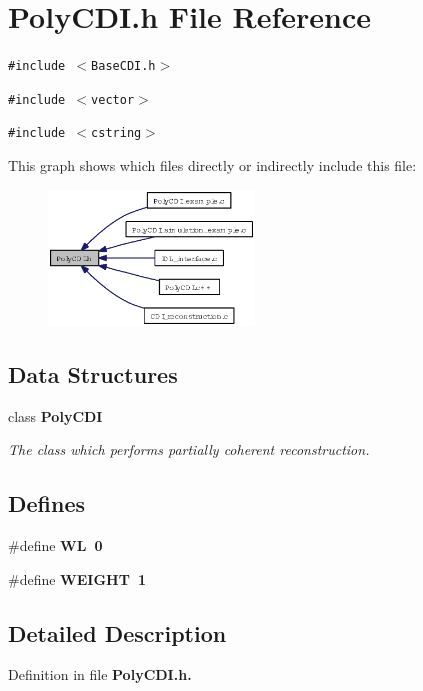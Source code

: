 \section{Poly\-CDI.h File Reference}
\label{PolyCDI_8h}
{\tt \#include $<$Base\-CDI.h$>$}\par
{\tt \#include $<$vector$>$}\par
{\tt \#include $<$cstring$>$}\par


This graph shows which files directly or indirectly include this file:\begin{figure}[H]
\begin{center}
\leavevmode
\includegraphics[width=155pt]{PolyCDI_8h__dep__incl}
\end{center}
\end{figure}
\subsection*{Data Structures}
\begin{CompactItemize}
\item 
class \bf{Poly\-CDI}
\begin{CompactList}\small\item\em The class which performs partially coherent reconstruction. \item\end{CompactList}\end{CompactItemize}
\subsection*{Defines}
\begin{CompactItemize}
\item 
\#define \bf{WL}~0\label{PolyCDI_8h_ec70dd1e9ed3c793ea9abbcceff787a4}

\item 
\#define \bf{WEIGHT}~1\label{PolyCDI_8h_b82d5fd8e274d3d125a1e382ceceab7c}

\end{CompactItemize}


\subsection{Detailed Description}


Definition in file \bf{Poly\-CDI.h}.